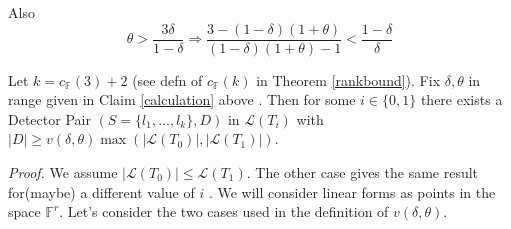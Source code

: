 \documentclass[letterpaper,USenglish,numberwithinsect]{lipics}
\newcommand{\F}{\mathbb{F}}
\newcommand{\ML}{\mathcal{L}}
\begin{document}
Also
\[
\theta > \frac{3\delta}{1-\delta} \Rightarrow
\frac{3-(1-\delta)(1+\theta)}{(1-\delta)(1+\theta)-1} <
\frac{1-\delta}{\delta}
\]




\begin{lemma}\label{largedetectorproof}
Let $k=c_{\F}(3)+2$ (see defn of $c_\F(k)$ in Theorem \ref{rankbound}). Fix $\delta, \theta$ in range given in Claim \ref{calculation} above .
Then for some $i\in \{0,1\}$ there exists a Detector Pair
$(S=\{l_{1},\ldots,l_{k}\},D)$ in $\ML(T_i)$  with
$|D|\geq v(\delta,\theta) \max(|\ML(T_{0})|,|\ML(T_{1})|)$.

\end{lemma}

\emph{Proof.}
We assume $|\ML(T_0)|\leq \ML(T_1)$. The other case gives the same result for(maybe) a different value of $i$ .
 We will consider linear forms as points in the space $\F^r$. Let's consider the
two cases used in the definition of $v(\delta,\theta)$.
\end{document}
